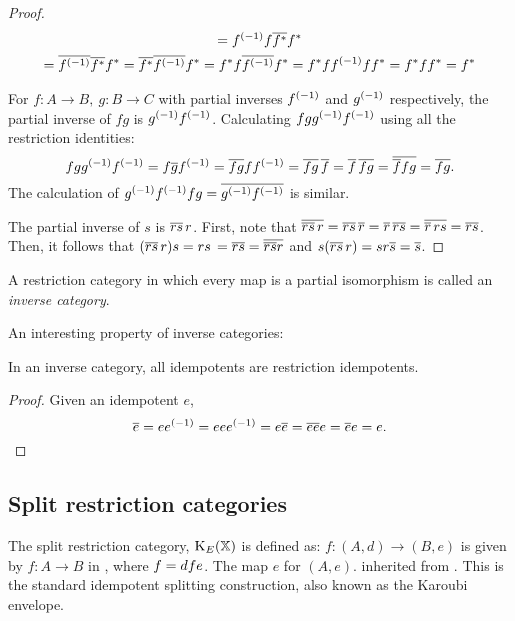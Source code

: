 \begin{proof}
\begin{multline*}
= \inv{f} f \restr{f^*} f^*  \\ %
= \restr{\inv{f}}\restr{f^*} f^*   %
= \restr{f^*}\restr{\inv{f}} f^* %
= f^* f \restr{\inv{f}}  f^* %
= f^* f \inv{f} f f^* %
= f^* f f^* %
= f^* %
\end{multline*}
\item For $f:A\to B,\ g:B\to C$ with partial inverses ${f}^{(-1)}$ and ${g}^{(-1)}$ respectively, the
partial inverse of $f g$ is ${g}^{(-1)} {f}^{(-1)}$. Calculating $f g {g}^{(-1)} {f}^{(-1)}$
using all the
restriction identities:
\[f g {g}^{(-1)} {f}^{(-1)} = f \overline{g} {f}^{(-1)} = \overline{f g} f {f}^{(-1)} =
\overline{f g}\, \overline{f} =
\overline{f}\, \overline{f g} = \overline{\overline{f} f g} = \overline{f g}.\]
The calculation of ${g}^{(-1)} {f}^{(-1)} f g = \overline{{g}^{(-1)} {f}^{(-1)}}$ is similar.
\item The partial inverse of $s$ is $\overline{r s}\,r$. First, note
that $\overline{\overline{r s}\,r}
= \overline{r s}\,\overline{r}
= \overline{r}\, \overline{r s}
= \overline{\overline{r}\,r s}
= \overline{r s}$.
Then, it follows that $(\overline{r s}\,r) s
= r s\,= \overline{r s}
= \overline{\overline{r s}r} $ and
$s (\restr{r s}\,r)
= s r \restr{s} %
= \restr{s}$.
\eproofenum
\end{proof}


A restriction category in which every map is a partial
isomorphism is called an \emph{inverse category}.

An interesting property of inverse categories:

\begin{lemma}\label{lem:inverse_idempotents_are_restriction_idempotents}
  In an inverse category, all idempotents are restriction idempotents.
\end{lemma}
\begin{proof}
Given an idempotent $e$,
\[\overline{e} = e{e}^{(-1)} = e e {e}^{(-1)} = e \overline{e} = \overline{e e} e = \overline{e} e = e.\]
\end{proof}
\subsection{Split restriction categories} %
\label{sub:split_restriction_categories}

The split restriction category,
$\text{K}_{E}(\mathbb{X})$  is defined as:
{$f:(A,d)\to(B,e)$ is given by $f:A\to B$ in \X, where $f = d\hspace{0.1pt} f e$.}
{The map $e$ for $(A,e)$.}
{inherited from \X.}
This is the standard idempotent splitting construction, also known as the Karoubi
envelope.

